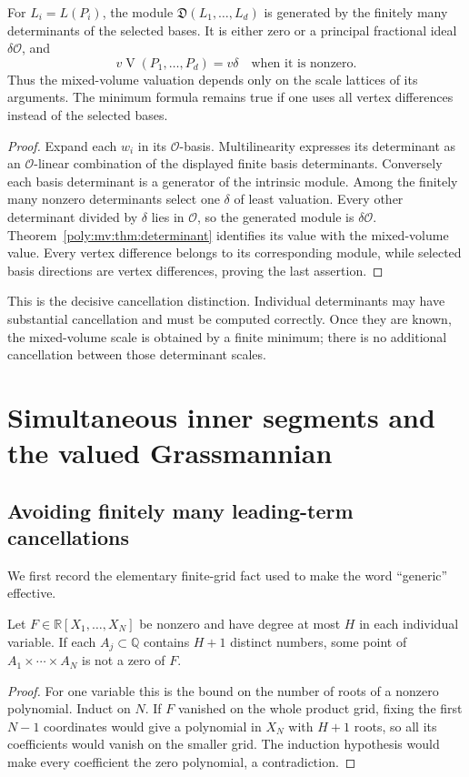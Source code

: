 \documentclass[11pt,a4paper]{article}
\numberwithin{equation}{section}
\theoremstyle{plain}
\newcommand{\R}{\mathbb R}
\newcommand{\Q}{\mathbb Q}
\newcommand{\OO}{\mathcal O}
\newcommand{\MV}{\operatorname{V}}
\newcommand{\Dideal}{\mathfrak D}
\begin{document}
\begin{proposition}
\label{poly:mv:prop:ideal}
For $L_i=L(P_i)$, the module $\Dideal(L_1,\ldots,L_d)$ is generated by
the finitely many determinants of the selected bases. It is either zero
or a principal fractional ideal $\delta\OO$, and
\[
 v\MV(P_1,\ldots,P_d)=v\delta
 \quad\text{when it is nonzero}.
\]
Thus the mixed-volume valuation depends only on the scale lattices of
its arguments. The minimum formula remains true if one uses all vertex
differences instead of the selected bases.
\end{proposition}
\begin{proof}
Expand each $w_i$ in its $\OO$-basis. Multilinearity expresses its
determinant as an $\OO$-linear combination of the displayed finite
basis determinants. Conversely each basis determinant is a generator of
the intrinsic module. Among the finitely many nonzero determinants select
one $\delta$ of least valuation. Every other determinant divided by
$\delta$ lies in $\OO$, so the generated module is $\delta\OO$.
Theorem~\ref{poly:mv:thm:determinant} identifies its value with the mixed-volume
value. Every vertex difference belongs to its corresponding module,
while selected basis directions are vertex differences, proving the last
assertion.
\end{proof}

This is the decisive cancellation distinction. Individual determinants
may have substantial cancellation and must be computed correctly. Once
they are known, the mixed-volume scale is obtained by a finite minimum;
there is no additional cancellation between those determinant scales.

\section{Simultaneous inner segments and the valued Grassmannian}
\label{poly:mv:sec:segments}

\subsection{Avoiding finitely many leading-term cancellations}
We first record the elementary finite-grid fact used to make the word
``generic'' effective.

\begin{lemma}
\label{poly:mv:lem:grid}
Let $F\in\R[X_1,\ldots,X_N]$ be nonzero and have degree at most $H$ in
each individual variable. If each $A_j\subset\Q$ contains $H+1$
distinct numbers, some point of $A_1\times\cdots\times A_N$ is not a
zero of $F$.
\end{lemma}
\begin{proof}
For one variable this is the bound on the number of roots of a nonzero
polynomial. Induct on $N$. If $F$ vanished on the whole product grid,
fixing the first $N-1$ coordinates would give a polynomial in $X_N$ with
$H+1$ roots, so all its coefficients would vanish on the smaller grid.
The induction hypothesis would make every coefficient the zero
polynomial, a contradiction.
\end{proof}
\end{document}
